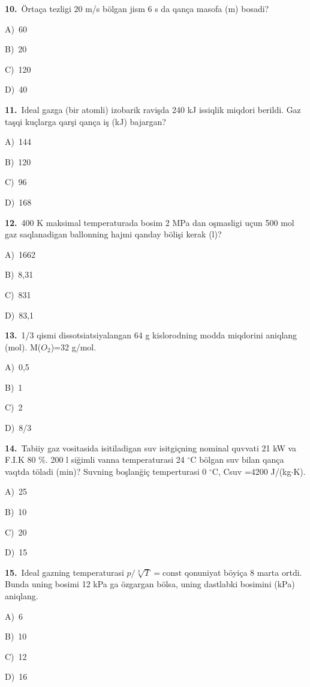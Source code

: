\documentclass[11pt,a4paper]{article}
\newcommand{\opt}[2]{\hspace*{4mm}#1)\ #2\par}
\begin{document}
\noindent\begin{minipage}{\linewidth}
\textbf{10.}\ Örtaça tezligi 20 m/s bölgan jism 6 s da qança masofa (m) bosadi?\par\smallskip
\opt{A}{60}
\opt{B}{20}
\opt{C}{120}
\opt{D}{40}
\end{minipage}\vspace{9pt}\par
\noindent\begin{minipage}{\linewidth}
\textbf{11.}\ Ideal gazga (bir atomli) izobarik ravişda 240 kJ issiqlik miqdori berildi. Gaz taşqi kuçlarga qarşi qança iş (kJ) bajargan?\par\smallskip
\opt{A}{144}
\opt{B}{120}
\opt{C}{96}
\opt{D}{168}
\end{minipage}\vspace{9pt}\par
\noindent\begin{minipage}{\linewidth}
\textbf{12.}\ 400 K maksimal temperaturada bosim 2 MPa dan oşmasligi uçun 500 mol gaz saqlanadigan ballonning hajmi qanday bölişi kerak (l)?\par\smallskip
\opt{A}{1662}
\opt{B}{8,31}
\opt{C}{831}
\opt{D}{83,1}
\end{minipage}\vspace{9pt}\par
\noindent\begin{minipage}{\linewidth}
\textbf{13.}\ 1/3 qismi dissotsiatsiyalangan 64 g kislorodning modda miqdorini aniqlang (mol). M($O_2$)=32 g/mol.\par\smallskip
\opt{A}{0,5}
\opt{B}{1}
\opt{C}{2}
\opt{D}{8/3}
\end{minipage}\vspace{9pt}\par
\noindent\begin{minipage}{\linewidth}
\textbf{14.}\ Tabiiy gaz vositasida isitiladigan suv isitgiçning nominal quvvati 21 kW va F.I.K 80 \%. 200 l siğimli vanna temperaturasi 24 $^\circ$C bölgan suv bilan qança vaqtda töladi (min)? Suvning boşlanğiç temperturasi 0 $^\circ$C, Csuv =4200 J/(kg$\cdot$K).\par\smallskip
\opt{A}{25}
\opt{B}{10}
\opt{C}{20}
\opt{D}{15}
\end{minipage}\vspace{9pt}\par
\noindent\begin{minipage}{\linewidth}
\textbf{15.}\ Ideal gazning temperaturasi $p/\sqrt[3]{T}=\mathrm{const}$ qonuniyat böyiça 8 marta ortdi. Bunda uning bosimi 12 kPa ga özgargan bölsa, uning dastlabki bosimini (kPa) aniqlang.\par\smallskip
\opt{A}{6}
\opt{B}{10}
\opt{C}{12}
\opt{D}{16}
\end{minipage}\vspace{9pt}\par
\end{document}
